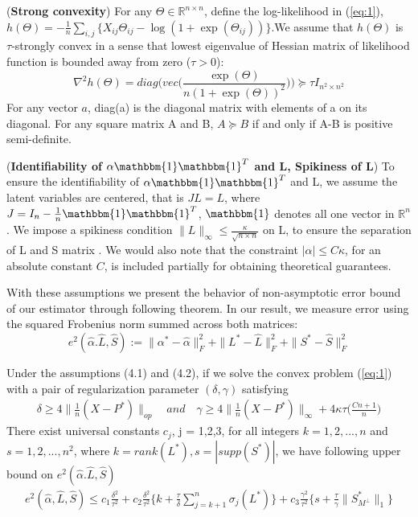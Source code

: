 \documentclass[AMS,STIX1COL]{WileyNJD-v2}
\begin{document}
\begin{assumption} (\textbf{Strong convexity})
For any $\Theta \in \mathbb{R}^{n\times n}$, define the log-likelihood in (\ref{eq:1}), $h(\Theta) = -\frac{1}{n}\sum_{i,j} \big\{ X_{ij}\Theta_{ij} - \log(1+\exp(\Theta_{ij})) \big\}$.We assume that $h(\Theta)$ is $\tau$-strongly convex in a sense that lowest eigenvalue of Hessian matrix of likelihood function is bounded away from zero ($\tau > 0$):
\[
\nabla^{2}h(\Theta) = diag\Big(vec\Big(\frac{\exp(\Theta)}{n(1+\exp(\Theta))^{2}}
\Big)\Big) \succcurlyeq \tau I_{n^{2} \times n^{2}}
\]
For any vector $a$, diag(a) is the diagonal matrix with elements of a on its diagonal. 
For any square matrix A and B, $ A \succcurlyeq B $ if and only if A-B is positive semi-definite.
\end{assumption}

\begin{assumption} (\textbf{Identifiability of $\alpha\mathbbm{1}\mathbbm{1}^T$ and L, Spikiness of L})
To ensure the identifiability of $\alpha\mathbbm{1}\mathbbm{1}^T$ and L, we assume the latent variables are centered, that is $JL=L$, where $J=I_{n}-\frac{1}{n}\mathbbm{1}\mathbbm{1}^T$, $\mathbbm{1}$ denotes all one vector in $\mathbb{R}^{n}$. 
We impose a spikiness condition $\|L\|_{\infty}\leq\frac{\kappa}{\sqrt{n \times n}}$ on L, to ensure the separation of L and S matrix \cite{agarwal2012noisy}. 
We would also note that the constraint $|\alpha|\leq C\kappa$, for an absolute constant $C$, is included partially for obtaining theoretical guarantees.
\end{assumption}

With these assumptions we present the behavior of non-asymptotic error bound of our estimator through following theorem. 
In our result, we measure error using the squared Frobenius norm summed across both matrices:
\[
    e^{2}(\hat{\alpha}.\hat{L},\hat{S}):=\|\alpha^{*}-\hat{\alpha}\|_{F}^{2} + \|L^{*}-\hat{L}\|_{F}^{2} + \|S^{*}-\hat{S}\|_{F}^{2}
\]

\begin{theorem}
Under the assumptions (4.1) and (4.2),
if we solve the convex problem (\ref{eq:1}) with a pair of regularization parameter $(\delta,\gamma)$ satisfying
\begin{align}
\delta \geq 4\|\frac{1}{n}(X-P^{*})\|_{op} \quad and \quad \gamma \geq 4\|\frac{1}{n}(X-P^{*})\|_{\infty}+4\kappa\tau\bigg(\frac{Cn+1}{n} \bigg)
\end{align}
There exist universal constants $c_{j}$, j = 1,2,3,  for all integers $k = 1,2,...,n$ and $s = 1,2,...,n^{2}$, where $k = rank(L^{*}), s= |supp(S^{*})|$, we have following upper bound on $e^{2}(\hat{\alpha}.\hat{L},\hat{S})$
\begin{align}
    e^{2}(\hat{\alpha},\hat{L},\hat{S}) \leq
    c_{1}\frac{\delta^{2}}{\tau^{2}} +
    c_{2}\frac{\delta^{2}}{\tau^{2}}
    \bigg\{k + \frac{\tau}{\delta}\sum_{j=k+1}^{n}\sigma_{j}(L^{*})\bigg\} +
    c_{3}\frac{\gamma^{2}}{\tau^{2}}
    \bigg\{s + \frac{\tau}{\gamma}\|S^*_{M^\perp}\|_{1}\bigg\}
\end{align}
\end{theorem}
\end{document}
